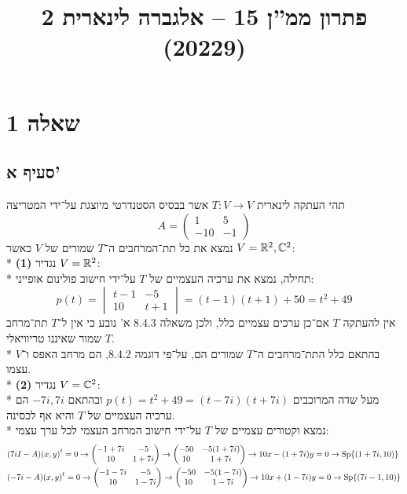 
\title{פתרון ממ''ן 15 – אלגברה לינארית 2 (20229)}

\usepackage{tikzducks}


\maketitle
\maketitleprint{}
\tableofcontents

\section{שאלה 1}
\subsection{סעיף א'}
תהי העתקה לינארית $T : V \to V$ אשר בבסיס הסטנדרטי מיוצגת על־ידי המטריצה
\[
	A = \begin{pmatrix}
		1 & 5 \\
		-10 & -1
	\end{pmatrix}
\]
נמצא את כל תת־המרחבים ה־$T$ שמורים של $V$ כאשר $V = \mathbb{R}^2, \mathbb{C}^2$: \\*
\textbf{(1)}
נגדיר $V = \mathbb{R}^2$: \\*
תחילה, נמצא את ערכיה העצמיים של $T$ על־ידי חישוב פולינום אופייני:
\[
	p(t) = \begin{vmatrix}
		t - 1 & -5 \\
		10 & t + 1
	\end{vmatrix}
	= (t - 1)(t + 1) + 50
	= t^2 + 49
\]
אין להעתקה $T$ אם־כן ערכים עצמיים כלל, ולכן משאלה 8.4.3 א' נובע כי אין ל־$T$ תת־מרחב $T$ שמור שאיננו טריוויאלי. \\*
בהתאם כלל התת־מרחבים ה־$T$ שמורים הם, על־פי דוגמה 8.4.2, הם מרחב האפס ו־$V$ עצמו. \\*
\textbf{(2)}
נגדיר $V = \mathbb{C}^2$: \\*
מעל שדה המרוכבים $p(t) = t^2 + 49 = (t - 7i)(t + 7i)$ ובהתאם $-7i, 7i$ הם ערכיה העצמיים של $T$ והיא אף לכסינה. \\*
נמצא וקטורים עצמיים של $T$ על־ידי חישוב המרחב העצמי לכל ערך עצמי:
\begin{align*}
	& (7i I - A) {(x, y)}^t = 0 \rightarrow
	\begin{pmatrix}
		-1 + 7i & -5 \\
		10 & 1 + 7i
	\end{pmatrix}
	\rightarrow
	\begin{pmatrix}
		-50 & -5(1 + 7i) \\
		10 & 1 + 7i
	\end{pmatrix}
	\rightarrow
	10x - (1 + 7i)y = 0
	\rightarrow
	\operatorname{Sp}\{ (1 + 7i, 10) \} \\
	& (-7i - A) {(x, y)}^t = 0
	\rightarrow
	\begin{pmatrix}
		-1 -7i & -5 \\
		10 & 1 - 7i
	\end{pmatrix}
	\rightarrow
	\begin{pmatrix}
		-50 & -5(1 - 7i) \\
		10 & 1 - 7i
	\end{pmatrix}
	\rightarrow
	10x + (1 - 7i)y = 0
	\rightarrow
	\operatorname{Sp}\{ (7i - 1, 10) \}
\end{align*}
